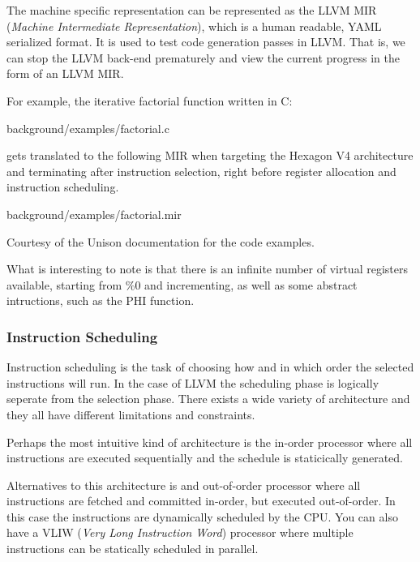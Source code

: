 The machine specific representation can be represented as the LLVM MIR (\textit{Machine
Intermediate Representation}), which is a human readable, YAML serialized format. It is
used to test code generation passes in LLVM. That is, we can stop the LLVM back-end
prematurely and view the current progress in the form of an LLVM MIR.

For example, the iterative factorial function written in C:


{background/examples/factorial.c}

gets translated to the following MIR when targeting the Hexagon V4 architecture and
terminating after instruction selection, right before register allocation and instruction
scheduling.


{background/examples/factorial.mir}

Courtesy of the Unison documentation for the code examples.

What is interesting to note is that there is an infinite number of virtual registers available,
starting from \%0 and incrementing, as well as some abstract intructions, such as the PHI
function.

\subsubsection{Instruction Scheduling}
Instruction scheduling is the task of choosing how and in which order the selected instructions
will run. In the case of LLVM the scheduling phase is logically seperate from the selection
phase. There exists a wide variety of architecture and they all have different limitations
and constraints.

Perhaps the most intuitive kind of architecture is the in-order processor where all
instructions are executed sequentially and the schedule is staticically generated.

Alternatives to this architecture is and out-of-order processor where all instructions are
fetched and committed in-order, but executed out-of-order. In this case the instructions
are dynamically scheduled by the CPU. You can also have a VLIW (\textit{Very Long Instruction
Word}) processor where multiple instructions can be statically scheduled in parallel.

